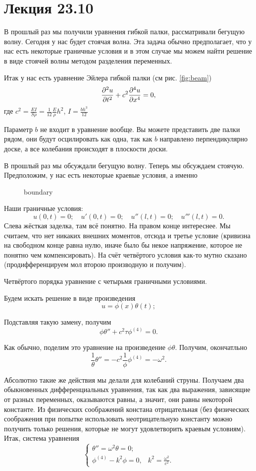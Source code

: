 \section{Лекция 23.10}
В прошлый раз мы получили уравнения гибкой палки, рассматривали бегущую волну. Сегодня у нас будет стоячая волна. Эта задача обычно предполагает, что у нас есть некоторые граничные условия и в этом случае мы можем найти решение в виде стоячей волны методом разделения переменных.

Итак у нас есть уравнение Эйлера гибкой палки (см рис. \ref{fig:beam})
\[
  \frac{\partial ^2u}{\partial t^2} + c^2 \frac{\partial ^4u}{\partial x^4} = 0,
\]
где $c^2 = \frac{EI}{S\rho} = \frac1{12} \frac E\rho h^2$, $I = \frac{b h^3}{12}$

Параметр $b$ не входит в уравнение вообще. Вы можете представить две палки рядом, они будут осцилировать как одна, так как $b$ направлено перпендикулярно доске, а все колебания происходят в плоскости доски.

В прошлый раз мы обсуждали бегущую волну. Теперь мы обсуждаем стоячую. Предположим, у нас есть некоторые краевые условия, а именно
\begin{figure}[H]
  \centering
  \caption{boundary}
  \label{fig:boundary}
\end{figure}
Наши граничные условия:
\[
  u(0,t) = 0;\quad
  u'(0,t) = 0;\quad
  u''(l,t) = 0;\quad
  u'''(l,t) = 0.
\]
Слева жёсткая заделка, там всё понятно. На правом конце интереснее. Мы считаем, что нет никаких внешних моментов, отсюда и третье условие (кривизна на свободном конце равна нулю, иначе было бы некое напряжение, которое не понятно чем компенсировать). На счёт четвёртого условия как-то мутно сказано (продифференцируем мол второю производную и получим).

Четвёртого порядка уравнение с четырьмя граничными условиями.

Будем искать решение в виде произведения
\[
  u = \phi(x)\theta(t);
\]

Подставляя такую замену, получим
\[
  \phi\theta'' + c^2 \tau \phi^{(4)} = 0.
\]

Как обычно, поделим это уравнение на произведение $\phi\theta$. Получим, окончатльно
\[
  \frac1\theta \theta'' = - c^2 \frac1\phi \phi^{(4)} = -\omega^2.
\]

Абсолютно такие же действия мы делали для колебаний струны. Получаем два обыкновенных дифференциальных уравнения, так как два выражения, зависящие от разных переменных, оказываются равны, а значит, они равны некоторой константе. Из физических соображений констана отрицательная (без физических соображения при попытке использовать неотрицательную константу можно получить только решения, которые не могут удовлетворить краевым условиям).
Итак, система уравнения
\[
  \begin{cases}
    \theta'' = \omega^2 \theta = 0;\\
    \phi^{(4)} - k^2 \phi = 0,& k^2 = \frac{\omega^2}{c^2}.
  \end{cases}
\]

